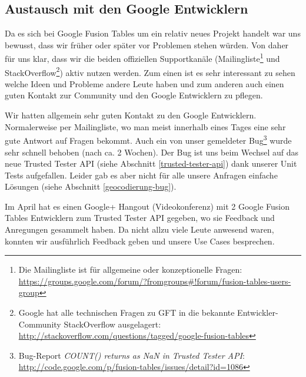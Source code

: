 \subsection{Austausch mit den Google Entwicklern}
Da es sich bei Google Fusion Tables um ein relativ neues Projekt handelt war uns bewusst, dass wir früher oder später vor Problemen stehen würden. Von daher für uns klar, dass wir die beiden offiziellen Supportkanäle (Mailingliste\footnote{Die Mailingliste ist für allgemeine oder konzeptionelle Fragen: \url{https://groups.google.com/forum/?fromgroups\#!forum/fusion-tables-users-group}} und StackOverflow\footnote{Google hat alle technischen Fragen zu GFT in die bekannte Entwickler-Community StackOverflow ausgelagert: \url{http://stackoverflow.com/questions/tagged/google-fusion-tables}}) aktiv nutzen werden. Zum einen ist es sehr interessant zu sehen welche Ideen und Probleme andere Leute haben und zum anderen auch einen guten Kontakt zur Community und den Google Entwicklern zu pflegen.

Wir hatten allgemein sehr guten Kontakt zu den Google Entwicklern. Normalerweise per Mailingliste, wo man meist innerhalb eines Tages eine sehr gute Antwort auf Fragen bekommt. Auch ein von unser gemeldeter Bug\footnote{Bug-Report \emph{COUNT() returns as NaN in Trusted Tester API}: \url{http://code.google.com/p/fusion-tables/issues/detail?id=1086}} wurde sehr schnell behoben (nach ca. 2 Wochen). Der Bug ist uns beim Wechsel auf das neue Trusted Tester API (siehe Abschnitt \ref{trusted-tester-api}) dank unserer Unit Tests aufgefallen. Leider gab es aber nicht für alle unsere Anfragen einfache Lösungen (siehe Abschnitt \ref{geocodierung-bug}).

Im April hat es einen Google+ Hangout (Videokonferenz) mit 2 Google Fusion Tables Entwicklern zum Trusted Tester API gegeben, wo sie Feedback und Anregungen gesammelt haben. Da nicht allzu viele Leute anwesend waren, konnten wir ausführlich Feedback geben und unsere Use Cases besprechen.











